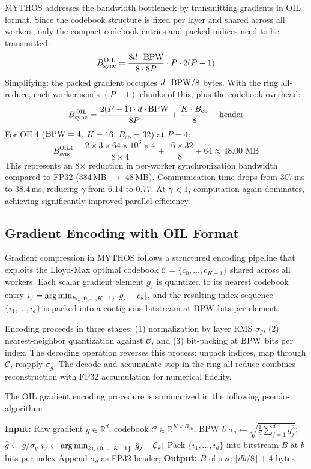 MYTHOS addresses the bandwidth bottleneck by transmitting gradients in OIL format. Since the codebook structure is fixed per layer and shared across all workers, only the compact codebook entries and packed indices need to be transmitted:
\[
B_{\text{sync}}^{\text{OIL}} = \frac{8d \cdot \textnormal{BPW}}{8 \cdot 8P} \cdot P \cdot 2(P-1)
\]
Simplifying: the packed gradient occupies $d \cdot \textnormal{BPW} / 8$ bytes. With the ring all-reduce, each worker sends $(P-1)$ chunks of this, plus the codebook overhead:
\[
B_{\text{sync}}^{\text{OIL}} = \frac{2(P-1) \cdot d \cdot \textnormal{BPW}}{8P} + \frac{K \cdot B_{\text{cb}}}{8} + \text{header}
\]
For OIL4 ($\textnormal{BPW} = 4$, $K = 16$, $B_{\text{cb}} = 32$) at $P = 4$:
\[
B_{\text{sync}}^{\text{OIL4}} = \frac{2 \times 3 \times 64 \times 10^6 \times 4}{8 \times 4} + \frac{16 \times 32}{8} + 64 \approx 48.00 \text{ MB}
\]
This represents an 8$\times$ reduction in per-worker synchronization bandwidth compared to FP32 (384\,MB $\to$ 48\,MB). Communication time drops from 307\,ms to 38.4\,ms, reducing $\gamma$ from 6.14 to 0.77. At $\gamma < 1$, computation again dominates, achieving significantly improved parallel efficiency.

\subsection{Gradient Encoding with OIL Format}
\label{sec:oil_grad_encoding}

Gradient compression in MYTHOS follows a structured encoding pipeline that exploits the Lloyd-Max optimal codebook $\mathcal{C} = \{c_0, \dots, c_{K-1}\}$ shared across all workers. Each scalar gradient element $g_j$ is quantized to its nearest codebook entry $i_j = \argmin_{k \in \{0,\dots,K-1\}} |g_j - c_k|$, and the resulting index sequence $\{i_1, \dots, i_d\}$ is packed into a contiguous bitstream at $\textnormal{BPW}$ bits per element.

Encoding proceeds in three stages: (1) normalization by layer RMS $\sigma_g$, (2) nearest-neighbor quantization against $\mathcal{C}$, and (3) bit-packing at $\textnormal{BPW}$ bits per index. The decoding operation reverses this process: unpack indices, map through $\mathcal{C}$, reapply $\sigma_g$. The decode-and-accumulate step in the ring all-reduce combines reconstruction with FP32 accumulation for numerical fidelity.

The OIL gradient encoding procedure is summarized in the following pseudo-algorithm:

\begin{algorithm}[H]
\caption{OIL Gradient Encoding for Distributed Training}
\label{alg:oil_encode}
\begin{algorithmic}[1]
\STATE \textbf{Input:} Raw gradient $g \in \mathbb{R}^d$, codebook $\mathcal{C} \in \mathbb{R}^{K \times B_{\text{cb}}}$, BPW $b$
\STATE $\sigma_g \gets \sqrt{\frac{1}{d} \sum_{j=1}^d g_j^2}$; $\hat{g} \gets g / \sigma_g$
    \STATE $i_j \gets \argmin_{k \in \{0,\dots,K-1\}} |\hat{g}_j - \mathcal{C}_k|$
\ENDFOR
\STATE Pack $\{i_1,\dots,i_d\}$ into bitstream $B$ at $b$ bits per index
\STATE Append $\sigma_g$ as FP32 header; \textbf{Output:} $B$ of size $\lceil d b / 8 \rceil + 4$ bytes
\end{algorithmic}
\end{algorithm}

